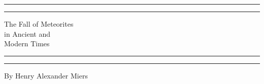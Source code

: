 \documentclass[a4paper, 12pt, oneside]{article}
\begin{document}
\bfseries
\Fontauri
\renewcommand{\thefigure}{\bfseries\Fontauri{\arabic{figure}}}
\renewcommand\thefootnote{\bfseries\Fontauri{\arabic{footnote}}}
\let\oldfootnote\footnote
    \renewcommand{\footnote}[1]{\oldfootnote{\bfseries\Fontauri#1}}

\pagestyle{plain} %
\begin{titlepage} %
	\centering %
	\scshape %

	
	\rule{\textwidth}{1.6pt}\vspace*{-\baselineskip}\vspace*{2pt} %
	\rule{\textwidth}{0.4pt} %
	
	\vspace{0.75\baselineskip} %

        {\LARGE The Fall of Meteorites \\ in Ancient and \\ Modern Times} %
	
	\vspace{0.75\baselineskip} %
	
	\rule{\textwidth}{0.4pt}\vspace*{-\baselineskip}\vspace{3.2pt} %
	\rule{\textwidth}{1.6pt} %
	
	\vspace{1\baselineskip} %
	
	
	{\large By Henry Alexander Miers} %
	
	\vspace*{1\baselineskip} %
	
	
	\vspace{1\baselineskip} %


\end{titlepage}
\end{document}
